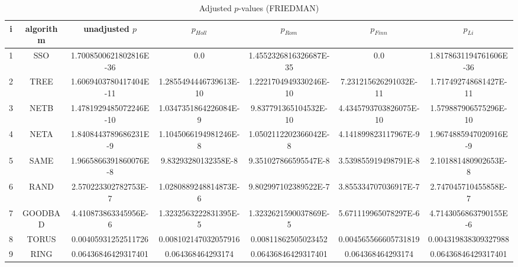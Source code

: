 \documentclass[a4paper,10pt]{article}
\begin{document}
\begin{landscape}
\begin{table}[!htp]
\centering\scriptsize
\caption{Adjusted $p$-values (FRIEDMAN)}
\begin{tabular}{ccccccc}
i&algorithm&unadjusted $p$&$p_{Holl}$&$p_{Rom}$&$p_{Finn}$&$p_{Li}$\\
\hline
1& SSO&1.7008500621802816E-36&0.0&1.4552326816326687E-35&0.0&1.8178631194761606E-36\\
2& TREE&1.6069403780417404E-11&1.2855494446739613E-10&1.2221704949330246E-10&7.231215626291032E-11&1.717492748681427E-11\\
3& NETB&1.4781929485072246E-10&1.0347351864226084E-9&9.837791365104532E-10&4.4345793703826075E-10&1.579887906575296E-10\\
4& NETA&1.8408443789686231E-9&1.1045066194981246E-8&1.0502112202366042E-8&4.141899823117967E-9&1.9674885947020916E-9\\
5& SAME&1.9665866391860076E-8&9.83293280132358E-8&9.351027866595547E-8&3.539855919498791E-8&2.101881480902653E-8\\
6& RAND&2.570223302782753E-7&1.0280889248814873E-6&9.802997102389522E-7&3.855334707036917E-7&2.747045710455858E-7\\
7& GOODBAD&4.410873863345956E-6&1.3232563222831395E-5&1.3232621590037869E-5&5.671119965078297E-6&4.7143056863790155E-6\\
8& TORUS&0.00405931252511726&0.008102147032057916&0.00811862505023452&0.004565566605731819&0.004319838309327988\\
9& RING&0.06436846429317401&0.064368464293174&0.06436846429317401&0.064368464293174&0.06436846429317401\\
\hline
\end{tabular}
\end{table}


\newpage


\end{landscape}
\end{document}
